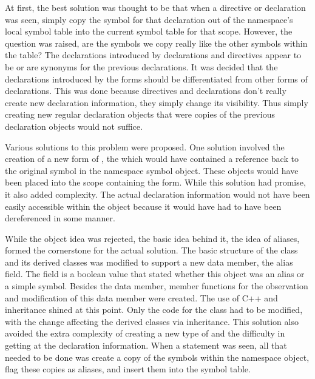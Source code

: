 At first, the best solution was thought to be that when a 
directive or declaration was seen, simply copy the symbol for that
declaration out of the namespace's local symbol table into the current
symbol table for that scope. However, the question was raised, are the
symbols we copy really like the other symbols within the table? The
declarations introduced by  declarations and directives appear to
be or are synonyms for the previous declarations. It was decided that
the declarations introduced by the  forms should be
differentiated from other forms of declarations. This was done because 
 directives and declarations don't really create new declaration
information, they simply change its visibility. Thus simply creating
new regular declaration objects that were copies of the previous
declaration objects would not suffice.

Various solutions to this problem were proposed. One solution involved
the creation of a new form of , the 
which would have contained a reference back to the original symbol in
the namespace symbol object. These  objects would have been
placed into the scope containing the  form. While this
solution had promise, it also added complexity. The actual declaration
information would not have been easily accessible within the 
object because it would have had to have been dereferenced in some manner.

While the  object idea was rejected, the basic idea
behind it, the idea of aliases, formed the cornerstone for the actual
solution. The basic structure of the  class and its
derived classes was modified to support a new data member, the alias
field. The  field is a boolean value that stated whether this
object was an alias or a simple symbol. Besides the data member,
member functions for the observation and modification of this data
member were created. The use of C++ and inheritance shined at this
point. Only the code for the  class had to be
modified, with the change affecting the derived classes via
inheritance. This solution also avoided the extra complexity of creating a
new type of  and the difficulty in getting at the declaration
information. When a  statement was seen, all that needed to be
done was create a copy of the symbols within the namespace
object, flag these copies as aliases, and insert them into the symbol
table.

